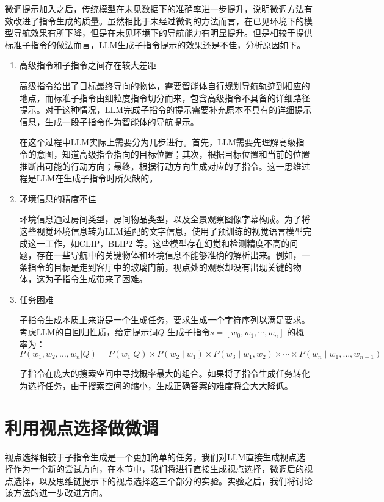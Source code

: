 \documentclass[bachelor]{thesis-uestc}
\begin{document}
微调提示加入之后，传统模型在未见数据下的准确率进一步提升，说明微调方法有效改进了指令生成的质量。虽然相比于未经过微调的方法而言，在已见环境下的模型导航效果有所下降，但是在未见环境下的导航能力有明显提升。但是相较于提供标准子指令的做法而言，LLM生成子指令提示的效果还是不佳，分析原因如下。

\begin{enumerate}
    \item 高级指令和子指令之间存在较大差距
    
    高级指令给出了目标最终导向的物体，需要智能体自行规划导航轨迹到相应的地点，而标准子指令由细粒度指令切分而来，包含高级指令不具备的详细路径提示。对于这种情况，LLM完成子指令的提示需要补充原本不具有的详细提示信息，生成一段子指令作为智能体的导航提示。

    在这个过程中LLM实际上需要分为几步进行。首先，LLM需要先理解高级指令的意图，知道高级指令指向的目标位置；其次，根据目标位置和当前的位置推断出可能的行动方向；最终，根据行动方向生成对应的子指令。这一思维过程是LLM在生成子指令时所欠缺的。

    \item 环境信息的精度不佳
    
    环境信息通过房间类型，房间物品类型，以及全景观察图像字幕构成。为了将这些视觉环境信息转为LLM适配的文字信息，使用了预训练的视觉语言模型完成这一工作，如CLIP，BLIP2 等。这些模型存在幻觉和检测精度不高的问题，存在一些导航中的关键物体和环境信息不能够准确的解析出来。例如，一条指令的目标是走到客厅中的玻璃门前，视点处的观察却没有出现关键的物体，这为子指令生成带来了困难。


    \item 任务困难
    
    子指令生成本质上来说是一个生成任务，要求生成一个字符序列以满足要求。考虑LLM的自回归性质，给定提示词$Q$ 生成子指令$s=[w_0,w_1,\cdots,w_n]$ 的概率为：
\[
P(w_1, w_2, \ldots, w_n | Q) = P(w_1|Q) \times P(w_2 \mid w_1) \times P(w_3 \mid w_1, w_2) \times \cdots \times P(w_n \mid w_1, \ldots, w_{n-1})
\]

子指令在庞大的搜索空间中寻找概率最大的组合。如果将子指令生成任务转化为选择任务，由于搜索空间的缩小，生成正确答案的难度将会大大降低。
\end{enumerate}

\section{利用视点选择做微调}

视点选择相较于子指令生成是一个更加简单的任务，我们对LLM直接生成视点选择作为一个新的尝试方向，在本节中，我们将进行直接生成视点选择，微调后的视点选择，以及思维链提示下的视点选择这三个部分的实验。实验之后，我们将讨论该方法的进一步改进方向。
\end{document}
